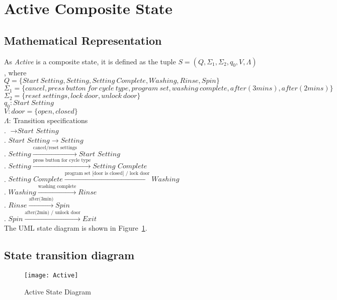 \newpage
\section{Active Composite State}

\subsection{Mathematical Representation}

\noindent As \textit{Active} is a composite state, it is defined as the tuple $S = (Q, \Sigma_1, \Sigma_2, q_0, V, \Lambda)$, where\\

\noindent $Q = \{Start~Setting, Setting, Setting~Complete, Washing, Rinse, Spin\}$\\
\noindent $\Sigma_1 = \{cancel, press~button~for~cycle~type, program~set, washing~complete, after(3 mins), after(2 mins)\}$\\
\noindent $\Sigma_2 = \{reset~settings, lock~door, unlock~door\}$\\
\noindent $q_0: Start~Setting$\\
\noindent $V: door = \{open, closed\}$\\
\noindent $\Lambda$: Transition specifications\\
. $\rightarrow \textit{Start Setting}$\\
. $\textit{Start Setting} \rightarrow Setting$\\
. $Setting \xrightarrow {\text {cancel/reset settings}} \textit{Start Setting}$\\
. $Setting \xrightarrow {\text {press button for cycle type}} \textit{Setting Complete}$\\
. $\textit{Setting Complete} \xrightarrow {\text {program set [door is closed] / lock door}} Washing$\\
. $Washing \xrightarrow {\text {washing complete}} Rinse$\\
. $Rinse \xrightarrow {\text {after(3min)}} Spin$\\
. $Spin \xrightarrow {\text {after(2min) / unlock door}} Exit$\\

\noindent The UML state diagram is shown in Figure~\ref{fig:Active}.

\newpage
\subsection{State transition diagram}

\begin{figure}[h!]
	\centering
		\texttt{[image: Active]}
		  \caption{Active State Diagram}\label{fig:Active}
\end{figure}
